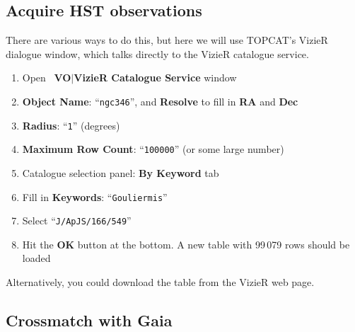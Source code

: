 \documentclass{article}
\newcommand{\buttimg}[1]
           {\mbox{\vtop{\vskip-2ex\hbox{\texttt{[image: \#1]}}}}}
\newcommand{\winfig}[2]
           {\vspace*{-0.5cm}
            \hspace*{0.5cm}\mbox{\vtop{\hbox{\texttt{[image: \#2]}}}}}
\newcommand{\lab}[1]{{\bf #1}}
\newcommand{\mb}[3]{\buttimg{#1}~\lab{#2}$\mid$\lab{#3}}
\newcommand{\entry}[2]{\lab{#1}: ``{\tt #2}''}
\begin{document}
\subsection{Acquire HST observations}

\begin{minipage}[t]{11cm}
  \raggedright
  There are various ways to do this, but here
  we will use TOPCAT's VizieR dialogue window,
  which talks directly to the VizieR catalogue service.
  \begin{enumerate}
  \item Open \mb{vizier_button.png}{VO}{VizieR Catalogue Service} window
  \item \entry{Object Name}{ngc346}, and \lab{Resolve} to fill in
        \lab{RA} and \lab{Dec}
  \item \entry{Radius}{1} (degrees)
  \item \entry{Maximum Row Count}{100000} (or some large number)
  \item Catalogue selection panel: \lab{By Keyword} tab
  \item Fill in \entry{Keywords}{Gouliermis}
  \item Select ``{\tt J/ApJS/166/549}''
  \item Hit the \lab{OK} button at the bottom.
        A new table with 99\,079 rows should be loaded
  \end{enumerate}
  Alternatively, you could download the table from the VizieR web page.
\end{minipage}
\begin{minipage}[t]{8cm}
  \vspace*{-1cm}
  \winfig{width=8cm}{n3_vizier.png}
\end{minipage}


\subsection{Crossmatch with Gaia}
\label{sec:cdsxmatch}
\end{document}
